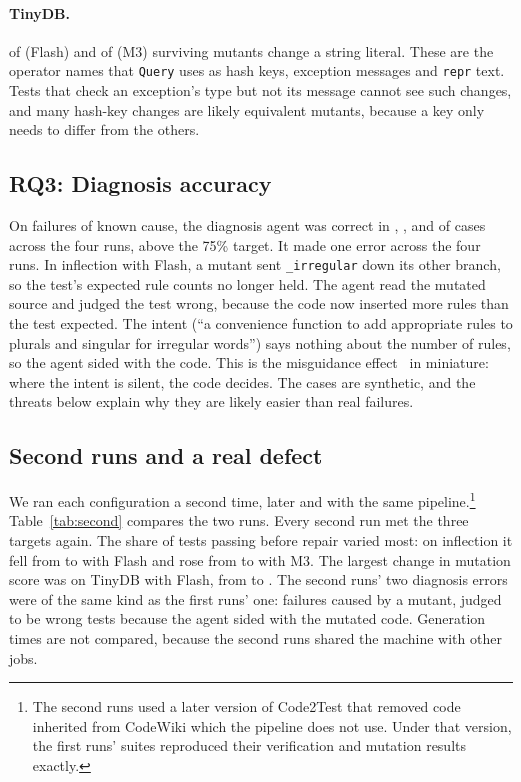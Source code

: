 \documentclass[11pt]{article}
\newcommand{\toolname}{Code2Test}
\newcommand{\code}[1]{\texttt{#1}}
\begin{document}
\paragraph{TinyDB.}
\TinyDBFlashStringSurvivors{} of \TinyDBFlashSurvivors{} (Flash) and \TinyDBMThreeStringSurvivors{} of \TinyDBMThreeSurvivors{} (M3) surviving mutants change a string literal.
These are the operator names that \code{Query} uses as hash keys, exception messages and \code{repr} text.
Tests that check an exception's type but not its message cannot see such changes, and many hash-key changes are likely equivalent mutants, because a key only needs to differ from the others.

\subsection{RQ3: Diagnosis accuracy}
On failures of known cause, the diagnosis agent was correct in \InflectionFlashDiagAccuracy{}, \InflectionMThreeDiagAccuracy{}, \TinyDBFlashDiagAccuracy{} and \TinyDBMThreeDiagAccuracy{} of cases across the four runs, above the 75\% target.
It made one error across the four runs.
In inflection with Flash, a mutant sent \code{\_irregular} down its other branch, so the test's expected rule counts no longer held.
The agent read the mutated source and judged the test wrong, because the code now inserted more rules than the test expected.
The intent (``a convenience function to add appropriate rules to plurals and singular for irregular words'') says nothing about the number of rules, so the agent sided with the code.
This is the misguidance effect~\cite{zhao2026misguidance} in miniature: where the intent is silent, the code decides.
The cases are synthetic, and the threats below explain why they are likely easier than real failures.

\subsection{Second runs and a real defect}\label{sec:second}
We ran each configuration a second time, later and with the same pipeline.\footnote{The second runs used a later version of \toolname{} that removed code inherited from CodeWiki which the pipeline does not use. Under that version, the first runs' suites reproduced their verification and mutation results exactly.}
Table~\ref{tab:second} compares the two runs.
Every second run met the three targets again.
The share of tests passing before repair varied most: on inflection it fell from \InflectionFlashFirstRate{} to \InflectionFlashSecondFirstRate{} with Flash and rose from \InflectionMThreeFirstRate{} to \InflectionMThreeSecondFirstRate{} with M3.
The largest change in mutation score was on TinyDB with Flash, from \TinyDBFlashMutationScore{} to \TinyDBFlashSecondMutationScore.
The second runs' two diagnosis errors were of the same kind as the first runs' one: failures caused by a mutant, judged to be wrong tests because the agent sided with the mutated code.
Generation times are not compared, because the second runs shared the machine with other jobs.
\end{document}
